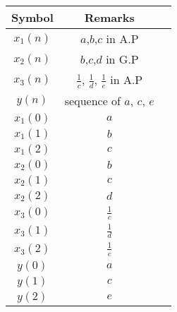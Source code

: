 \begin{tabular}{|c|c|c|}
    \hline
     \textbf{Symbol} & \textbf{Remarks} \\
    \hline
     $x_1(n)$ &  $a$,$b$,$c$ in A.P\\[6pt]
    \hline
     $x_2(n)$ &  $b$,$c$,$d$ in G.P\\[6pt]
    \hline
     $x_3(n)$ &  $\frac{1}{c}$, $\frac{1}{d}$, $\frac{1}{e}$ in A.P\\[6pt]
    \hline
     $y(n)$   &  sequence of $a$, $c$, $e$ \\[6pt]
    \hline
     $x_1(0)$ &  $a$\\[6pt]
    \hline
     $x_1(1)$ &  $b$\\[6pt]
    \hline
     $x_1(2)$ &  $c$\\[6pt]
    \hline
     $x_2(0)$ &  $b$\\[6pt]
    \hline
     $x_2(1)$ &  $c$\\[6pt]
    \hline
     $x_2(2)$ &  $d$\\[6pt]
    \hline
     $x_3(0)$ &  $\frac{1}{c}$\\[6pt]
    \hline
     $x_3(1)$ &  $\frac{1}{d}$\\[6pt]
    \hline
     $x_3(2)$ &  $\frac{1}{e}$\\[6pt]
    \hline
     $y(0)$   &  $a$\\[6pt]
    \hline
     $y(1)$   &  $c$\\[6pt]
    \hline
     $y(2)$   &  $e$\\[6pt]
    \hline
\end{tabular}

